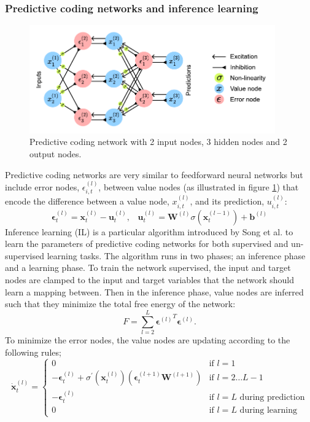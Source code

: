 \documentclass[a4paper,11pt]{article} %
\begin{document}
\subsubsection{Predictive coding networks and inference learning}
\begin{figure}
  \centering
  \includegraphics[width=300pt]{graphics/predictive-coding-network.pdf}
  \caption{Predictive coding network with 2 input nodes, 3 hidden nodes and 2 output nodes.}
  \label{fig:predictive-coding-network}
\end{figure}
Predictive coding networks are very similar to feedforward neural networks but include error nodes, $\epsilon_{i,t}^{(l)}$, between value nodes (as illustrated in figure \ref{fig:predictive-coding-network}) that encode the difference between a value node, $x_{i,t}^{(l)}$, and its prediction, $u_{i,t}^{(l)}$:
\begin{equation}
  \mathbf{\epsilon}_t^{(l)} = \mathbf{x}_t^{(l)} - \mathbf{u}_t^{(l)},\hspace{10pt}  \mathbf{u}_t^{(l)} = \mathbf{W}^{(l)} \sigma(\mathbf{x}_t^{(l-1)}) + \mathbf{b}^{(l)}
\end{equation}
 Inference learning (IL) is a particular algorithm introduced by Song et al. \cite{PredictiveCodingNetworks} to learn the parameters of predictive coding networks for both supervised and un-supervised learning tasks. The algorithm runs in two phases; an inference phase and a learning phase. To train the network supervised, the input and target nodes are clamped to the input and target variables that the network should learn a mapping between. Then in the inference phase, value nodes are inferred such that they minimize the total free energy of the network:
\begin{equation}
  F = \sum_{l=2}^{L}{
    {\mathbf{\epsilon}^{(l)}}^T\mathbf{\epsilon}^{(l)}.
  }
\end{equation}
To minimize the error nodes, the value nodes are updating according to the following rules;
\begin{equation} \label{eq:update-value-nodes}
  \dot{\mathbf{x}}_t^{(l)} = \begin{cases}
    0 & \text{if } l=1 \\
     -\mathbf{\epsilon}_t^{(l)} + \sigma^\prime(\mathbf{x}_t^{(l)}) ( \mathbf{\epsilon}_t^{(l+1)} \mathbf{W}^{(l+1)} )  & \text{if } l = 2 \ldots L-1 \\
    - \mathbf{\epsilon}_t^{(l)} & \text {if } l = L \text{ during prediction} \\
    0 & \text {if } l = L \text{ during learning}
  \end{cases}
\end{equation}
\end{document}
